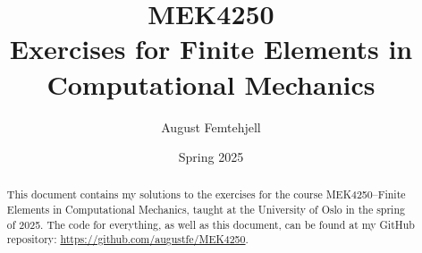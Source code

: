 \documentclass[a4paper,12pt]{article}
\title{
    MEK4250\\
    \small{Exercises for Finite Elements in Computational Mechanics}
}
\author{August Femtehjell}
\date{Spring 2025}
\theoremstyle{breaktheorem}
\theoremstyle{exerciseStyle}
\theoremstyle{solutionStyle}
\begin{document}
\maketitle

\tableofcontents

\begin{abstract}
    This document contains my solutions to the exercises for the course MEK4250--Finite Elements in Computational Mechanics, taught at the University of Oslo in the spring of 2025.
    The code for everything, as well as this document, can be found at my GitHub repository: \url{https://github.com/augustfe/MEK4250}.
\end{abstract}








\end{document}
